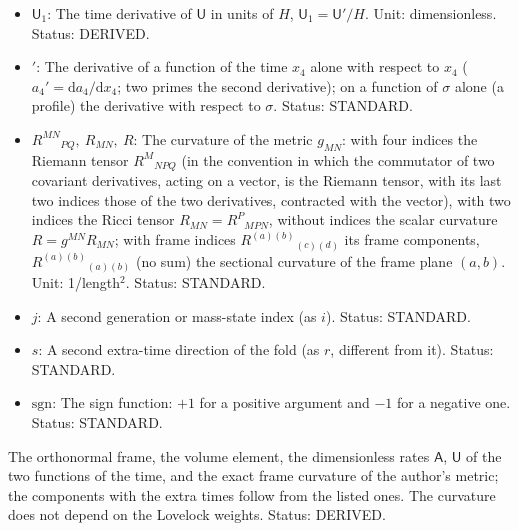 \documentclass[
  10pt,
]{article}
\begin{document}
\begin{itemize}
  dimensionless. Status: DERIVED.
\item
  \(\mathsf{U}_1\): The time derivative of \(\mathsf{U}\) in units of
  \(H\), \(\mathsf{U}_1 = \mathsf{U}'/H\). Unit: dimensionless. Status:
  DERIVED.
\item
  \({}'\): The derivative of a function of the time \(x_4\) alone with
  respect to \(x_4\) (\(a_4' = \mathrm{d}a_4/\mathrm{d}x_4\); two primes
  the second derivative); on a function of \(\sigma\) alone (a profile)
  the derivative with respect to \(\sigma\). Status: STANDARD.
\item
  \(R^{MN}{}_{PQ},\ R_{MN},\ R\): The curvature of the metric
  \(g_{MN}\): with four indices the Riemann tensor \(R^M{}_{NPQ}\) (in
  the convention in which the commutator of two covariant derivatives,
  acting on a vector, is the Riemann tensor, with its last two indices
  those of the two derivatives, contracted with the vector), with two
  indices the Ricci tensor \(R_{MN} = R^P{}_{MPN}\), without indices the
  scalar curvature \(R = g^{MN}R_{MN}\); with frame indices
  \(R^{(a)(b)}{}_{(c)(d)}\) its frame components,
  \(R^{(a)(b)}{}_{(a)(b)}\) (no sum) the sectional curvature of the
  frame plane \((a, b)\). Unit: 1/length\(^2\). Status: STANDARD.
\item
  \(j\): A second generation or mass-state index (as \(i\)). Status:
  STANDARD.
\item
  \(s\): A second extra-time direction of the fold (as \(r\), different
  from it). Status: STANDARD.
\item
  \(\mathrm{sgn}\): The sign function: \(+1\) for a positive argument
  and \(-1\) for a negative one. Status: STANDARD.
\end{itemize}

The orthonormal frame, the volume element, the dimensionless rates
\(\mathsf{A}\), \(\mathsf{U}\) of the two functions of the time, and the
exact frame curvature of the author's metric; the components with the
extra times follow from the listed ones. The curvature does not depend
on the Lovelock weights. Status: DERIVED.
\end{document}
